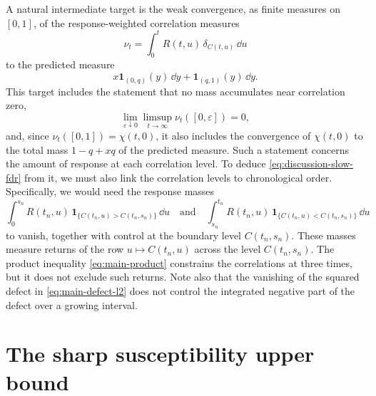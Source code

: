 A natural intermediate target is the weak convergence, as finite measures on $[0,1]$, of the response-weighted correlation measures
\[
 \nu_t=\int_0^t R(t,u)\,\delta_{C(t,u)}\,\dd u
\]
to the predicted measure
\[
 x\mathbf1_{(0,q)}(y)\,\dd y
       +\mathbf1_{(q,1)}(y)\,\dd y.
\]
This target includes the statement that no mass accumulates near correlation zero,
\[
 \lim_{\varepsilon\downarrow0}\limsup_{t\to\infty}\nu_t([0,\varepsilon])=0,
\]
and, since $\nu_t([0,1])=\chi(t,0)$, it also includes the convergence of $\chi(t,0)$ to the total mass $1-q+xq$ of the predicted measure. Such a statement concerns the amount of response at each correlation level. To deduce \eqref{eq:discussion-slow-fdr} from it, we must also link the correlation levels to chronological order. Specifically, we would need the response masses
\[
 \int_0^{s_n}R(t_n,u)\,
       \mathbf1_{\{C(t_n,u)>C(t_n,s_n)\}}\,\dd u
 \quad\text{and}\quad
 \int_{s_n}^{t_n}R(t_n,u)\,
       \mathbf1_{\{C(t_n,u)<C(t_n,s_n)\}}\,\dd u
\]
to vanish, together with control at the boundary level $C(t_n,s_n)$. These masses measure returns of the row $u\mapsto C(t_n,u)$ across the level $C(t_n,s_n)$. The product inequality \eqref{eq:main-product} constrains the correlations at three times, but it does not exclude such returns. Note also that the vanishing of the squared defect in \eqref{eq:main-defect-l2} does not control the integrated negative part of the defect over a growing interval.

\section{The sharp susceptibility upper bound}\label{sec:discussion-susceptibility}

